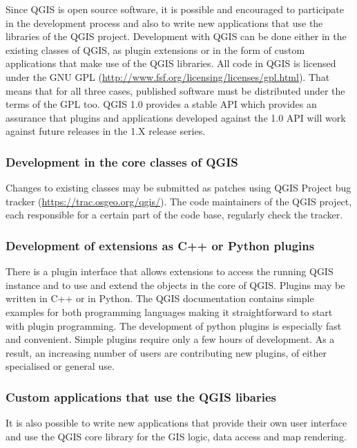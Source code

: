 
Since QGIS is open source software, it is possible and encouraged to participate in the development
process and also to write new applications that use the libraries of the QGIS
project. Development with QGIS can be done either in the existing classes of
QGIS, as plugin extensions or in the form of custom applications that make use
of the QGIS libraries. All code in QGIS is licensed under the
GNU GPL (\url{http://www.fsf.org/licensing/licenses/gpl.html}). That means that for all three cases, published software must be
distributed under the terms of the GPL too. QGIS 1.0 provides a stable API which 
provides an assurance that plugins and applications developed against the 1.0 API 
will work against future releases in the 1.X release series.

\subsubsection{Development in the core classes of QGIS}
Changes to existing classes may be submitted as patches using QGIS Project bug
tracker (\url{https://trac.osgeo.org/qgis/}). The code maintainers of the QGIS
project, each responsible for a certain part of the code base, regularly check
the tracker.

\subsubsection{Development of extensions as C++ or Python plugins}
There is a plugin interface that allows extensions to access the running QGIS
instance and to use and extend the objects in the core of QGIS. Plugins may be
written in C++ or in Python. The QGIS documentation contains simple examples
for both programming languages making it straightforward to start with plugin 
programming. The development of python plugins is especially fast and convenient. Simple plugins require only a few hours of development. As a result, an increasing number of users are contributing new plugins, of either specialised or general use.

\subsubsection{Custom applications that use the QGIS libaries}
It is also possible to write new applications that provide their own user
interface and use the QGIS core library for the GIS logic, data access and map
rendering. 


